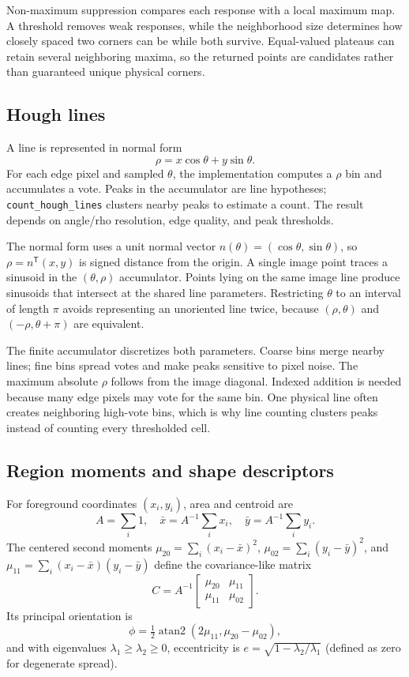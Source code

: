 \documentclass[11pt,a4paper]{article}
\newcommand{\1}{\mathbf{1}}
\begin{document}
Non-maximum suppression compares each response with a local maximum map. A
threshold removes weak responses, while the neighborhood size determines how
closely spaced two corners can be while both survive. Equal-valued plateaus
can retain several neighboring maxima, so the returned points are candidates
rather than guaranteed unique physical corners.

\subsection{Hough lines}

A line is represented in normal form
\[
  \rho=x\cos\theta+y\sin\theta.
\]
For each edge pixel and sampled $\theta$, the implementation computes a $\rho$
bin and accumulates a vote. Peaks in the accumulator are line hypotheses;
\texttt{count\_hough\_lines} clusters nearby peaks to estimate a count. The result
depends on angle/rho resolution, edge quality, and peak thresholds.

The normal form uses a unit normal vector
$n(\theta)=(\cos\theta,\sin\theta)$, so $\rho=n^{\mathsf T}(x,y)$ is signed
distance from the origin. A single image point traces a sinusoid in the
$(\theta,\rho)$ accumulator. Points lying on the same image line produce
sinusoids that intersect at the shared line parameters. Restricting $\theta$
to an interval of length $\pi$ avoids representing an unoriented line twice,
because $(\rho,\theta)$ and $(-\rho,\theta+\pi)$ are equivalent.

The finite accumulator discretizes both parameters. Coarse bins merge nearby
lines; fine bins spread votes and make peaks sensitive to pixel noise. The
maximum absolute $\rho$ follows from the image diagonal. Indexed addition is
needed because many edge pixels may vote for the same bin. One physical line
often creates neighboring high-vote bins, which is why line counting clusters
peaks instead of counting every thresholded cell.

\subsection{Region moments and shape descriptors}

For foreground coordinates $(x_i,y_i)$, area and centroid are
\[
 A=\sum_i1,\quad \bar{x}=A^{-1}\sum_i x_i,\quad
 \bar{y}=A^{-1}\sum_i y_i.
\]
The centered second moments $\mu_{20}=\sum_i(x_i-\bar{x})^2$,
$\mu_{02}=\sum_i(y_i-\bar{y})^2$, and
$\mu_{11}=\sum_i(x_i-\bar{x})(y_i-\bar{y})$ define the covariance-like matrix
\[
 C=A^{-1}\begin{bmatrix}\mu_{20}&\mu_{11}\\\mu_{11}&\mu_{02}\end{bmatrix}.
\]
Its principal orientation is
\[
 \phi=\tfrac12\operatorname{atan2}(2\mu_{11},\mu_{20}-\mu_{02}),
\]
and with eigenvalues $\lambda_1\ge\lambda_2\ge0$, eccentricity is
$e=\sqrt{1-\lambda_2/\lambda_1}$ (defined as zero for degenerate spread).
\end{document}
